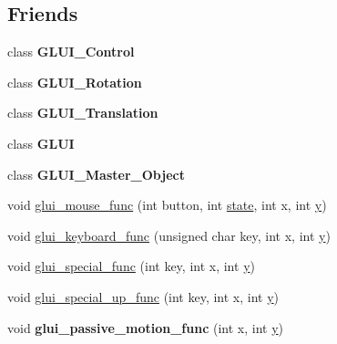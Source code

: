 \subsection*{Friends}
\begin{DoxyCompactItemize}
\item 
\hypertarget{class_g_l_u_i___main_a1ac6a21915ff78bdda7d92427b2b9337}{class {\bfseries G\+L\+U\+I\+\_\+\+Control}}\label{class_g_l_u_i___main_a1ac6a21915ff78bdda7d92427b2b9337}

\item 
\hypertarget{class_g_l_u_i___main_a7f68b21cd9d98467322b20fd2d4c739c}{class {\bfseries G\+L\+U\+I\+\_\+\+Rotation}}\label{class_g_l_u_i___main_a7f68b21cd9d98467322b20fd2d4c739c}

\item 
\hypertarget{class_g_l_u_i___main_a1c751e686f087581ee115c051b63e3ff}{class {\bfseries G\+L\+U\+I\+\_\+\+Translation}}\label{class_g_l_u_i___main_a1c751e686f087581ee115c051b63e3ff}

\item 
\hypertarget{class_g_l_u_i___main_a8b2353bef6e8c665a923971433c0c999}{class {\bfseries G\+L\+U\+I}}\label{class_g_l_u_i___main_a8b2353bef6e8c665a923971433c0c999}

\item 
\hypertarget{class_g_l_u_i___main_a89d3c98d28cb65cd25c91f17ffcd2bdf}{class {\bfseries G\+L\+U\+I\+\_\+\+Master\+\_\+\+Object}}\label{class_g_l_u_i___main_a89d3c98d28cb65cd25c91f17ffcd2bdf}

\item 
void \hyperlink{class_g_l_u_i___main_a6385df2c931519beca286ede9e098f96}{glui\+\_\+mouse\+\_\+func} (int button, int \hyperlink{structstate}{state}, int x, int \hyperlink{_ice_utils_8h_aa7ffaed69623192258fb8679569ff9ba}{y})
\item 
void \hyperlink{class_g_l_u_i___main_ae3390518e45a04617135f564021bcebf}{glui\+\_\+keyboard\+\_\+func} (unsigned char key, int x, int \hyperlink{_ice_utils_8h_aa7ffaed69623192258fb8679569ff9ba}{y})
\item 
void \hyperlink{class_g_l_u_i___main_a457caba107a71dff1918cb7dd271e8f1}{glui\+\_\+special\+\_\+func} (int key, int x, int \hyperlink{_ice_utils_8h_aa7ffaed69623192258fb8679569ff9ba}{y})
\item 
void \hyperlink{class_g_l_u_i___main_a4ec805192c619c072072964215964435}{glui\+\_\+special\+\_\+up\+\_\+func} (int key, int x, int \hyperlink{_ice_utils_8h_aa7ffaed69623192258fb8679569ff9ba}{y})
\item 
\hypertarget{class_g_l_u_i___main_a783f2a1497c9cc9e2f8c45244c20cc5e}{void {\bfseries glui\+\_\+passive\+\_\+motion\+\_\+func} (int x, int \hyperlink{_ice_utils_8h_aa7ffaed69623192258fb8679569ff9ba}{y})}\label{class_g_l_u_i___main_a783f2a1497c9cc9e2f8c45244c20cc5e}


\end{DoxyCompactItemize}
